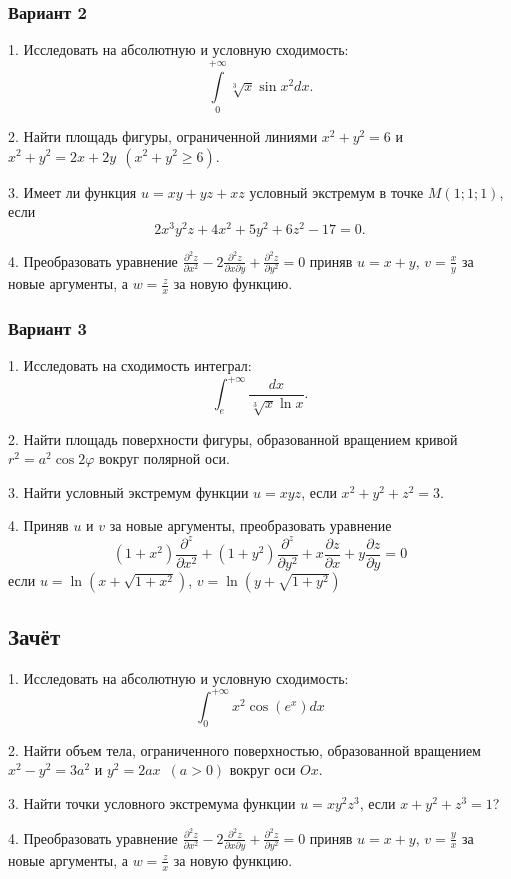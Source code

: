 \documentclass[a4paper]{article}
\newcommand{\No}{\textnumero}
\begin{document}
\subsubsection{Вариант 2}

1. Исследовать на абсолютную и условную сходимость:
$$
\int\limits_0^{+\infty}\sqrt[3]{x}\sin x^2dx.
$$

2. Найти площадь фигуры, ограниченной линиями $x^2+y^2=6$ и
$x^2+y^2=2x+2y\ \ (x^2+y^2\ge 6)$.

3. Имеет ли функция $u=xy+yz+xz$ условный экстремум в точке
$M(1;1;1)$, если
$$2x^3y^2z+4x^2+5y^2+6z^2-17=0.$$

4. Преобразовать уравнение
$\displaystyle\frac{\partial^2z}{\partial
x^2}-2\frac{\partial^2z}{\partial x\partial y}+\frac{\partial^2
z}{\partial y^2}=0$ приняв $u=x+y$, $v=\displaystyle\frac{x}{y}$
за новые аргументы, а $w=\frac{z}{x}$ за новую функцию.

\subsubsection{Вариант 3}

1. Исследовать на сходимость интеграл:
$$
\int_e^{+\infty}\frac{dx}{\sqrt[3]x\ln x}.
$$

2. Найти площадь поверхности фигуры, образованной вращением кривой
$r^2=a^2\cos 2\varphi$ вокруг полярной оси.

3. Найти условный экстремум функции $u=xyz$, если $x^2+y^2+z^2=3$.

4. Приняв $u$ и $v$ за новые аргументы, преобразовать уравнение
$$
(1+x^2)\frac{\partial^z}{\partial
x^2}+(1+y^2)\frac{\partial^z}{\partial y^2}+x\frac{\partial
z}{\partial x}+y\frac{\partial z}{\partial y}=0
$$
если $u=\ln (x+\sqrt{1+x^2})$, $v=\ln (y+\sqrt{1+y^2})$

\subsection{Зачёт \No 1}

1. Исследовать на абсолютную и условную сходимость:
$$
\int_0^{+\infty}x^2\cos (e^x)dx
$$

2. Найти объем тела, ограниченного поверхностью, образованной
вращением $x^2-y^2=3a^2$ и $y^2=2ax$\ $(a>0)$ вокруг оси $Ox$.

3. Найти точки условного экстремума функции $u=xy^2z^3$, если
$x+y^2+z^3=1$?

4. Преобразовать уравнение $\displaystyle\frac{\partial^2
z}{\partial x^2}-2\frac{\partial^2z}{\partial x\partial
y}+\frac{\partial^2z}{\partial y^2}=0$ приняв $u=x+y$,
$v=\displaystyle\frac{y}{x}$ за новые аргументы, а
$w=\displaystyle\frac{z}{x}$ за новую функцию.
\end{document}
